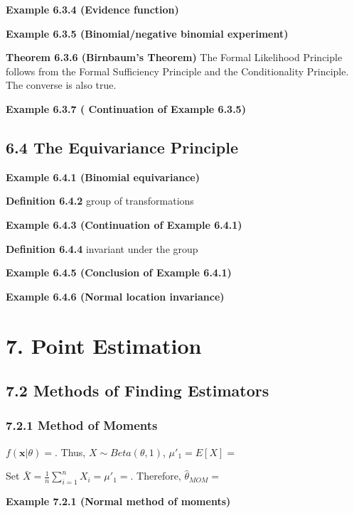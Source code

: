 \documentclass[6pt,twocolumn,Portrait]{article}
\begin{document}
\textbf{Example 6.3.4 (Evidence function)}

\textbf{Example 6.3.5 (Binomial/negative binomial experiment)}

\textbf{Theorem 6.3.6 (Birnbaum's Theorem)} The Formal Likelihood
Principle follows from the Formal Sufficiency Principle and the
Conditionality Principle. The converse is also true.

\textbf{Example 6.3.7 ( Continuation of Example 6.3.5)}

\hypertarget{the-equivariance-principle}{%
\subsection{6.4 The Equivariance
Principle}\label{the-equivariance-principle}}

\textbf{Example 6.4.1 (Binomial equivariance)}

\textbf{Definition 6.4.2} group of transformations

\textbf{Example 6.4.3 (Continuation of Example 6.4.1)}

\textbf{Definition 6.4.4} invariant under the group

\textbf{Example 6.4.5 (Conclusion of Example 6.4.1)}

\textbf{Example 6.4.6 (Normal location invariance)}

\hypertarget{point-estimation}{%
\section{7. Point Estimation}\label{point-estimation}}

\hypertarget{methods-of-finding-estimators}{%
\subsection{7.2 Methods of Finding
Estimators}\label{methods-of-finding-estimators}}

\hypertarget{MOM}{%
\subsubsection{7.2.1 Method of Moments}\label{MOM}}

\(f(\mathbf{x}|\theta)=\). Thus, \(X\sim Beta(\theta,1)\),
\(\mu'_1=E[X]=\)

Set \(\bar X=\frac1n\sum_{i=1}^nX_i=\mu'_1=\). Therefore,
\(\hat\theta_{MOM}=\)

\textbf{Example 7.2.1 (Normal method of moments)}
\end{document}
